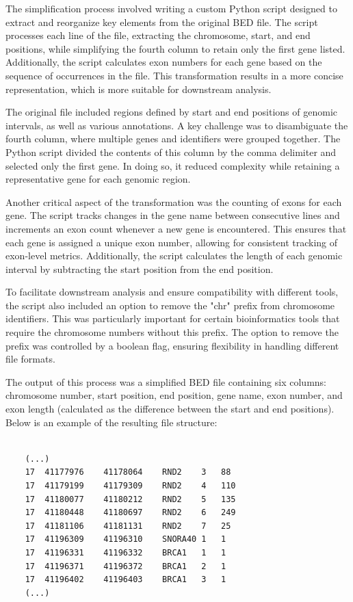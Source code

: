 The simplification process involved writing a custom Python script designed to extract and reorganize key elements from the original BED file. The script processes each line of the file, extracting the chromosome, start, and end positions, while simplifying the fourth column to retain only the first gene listed. Additionally, the script calculates exon numbers for each gene based on the sequence of occurrences in the file. This transformation results in a more concise representation, which is more suitable for downstream analysis.

The original file included regions defined by start and end positions of genomic intervals, as well as various annotations. A key challenge was to disambiguate the fourth column, where multiple genes and identifiers were grouped together. The Python script divided the contents of this column by the comma delimiter and selected only the first gene. In doing so, it reduced complexity while retaining a representative gene for each genomic region.

Another critical aspect of the transformation was the counting of exons for each gene. The script tracks changes in the gene name between consecutive lines and increments an exon count whenever a new gene is encountered. This ensures that each gene is assigned a unique exon number, allowing for consistent tracking of exon-level metrics. Additionally, the script calculates the length of each genomic interval by subtracting the start position from the end position.

To facilitate downstream analysis and ensure compatibility with different tools, the script also included an option to remove the "chr" prefix from chromosome identifiers. This was particularly important for certain bioinformatics tools that require the chromosome numbers without this prefix. The option to remove the prefix was controlled by a boolean flag, ensuring flexibility in handling different file formats.

The output of this process was a simplified BED file containing six columns: chromosome number, start position, end position, gene name, exon number, and exon length (calculated as the difference between the start and end positions). Below is an example of the resulting file structure:

\begin{verbatim}
    
    (...)
    17	41177976	41178064	RND2	3	88
    17	41179199	41179309	RND2	4	110
    17	41180077	41180212	RND2	5	135
    17	41180448	41180697	RND2	6	249
    17	41181106	41181131	RND2	7	25
    17	41196309	41196310	SNORA40	1	1
    17	41196331	41196332	BRCA1	1	1
    17	41196371	41196372	BRCA1	2	1
    17	41196402	41196403	BRCA1	3	1
    (...)
\end{verbatim}

